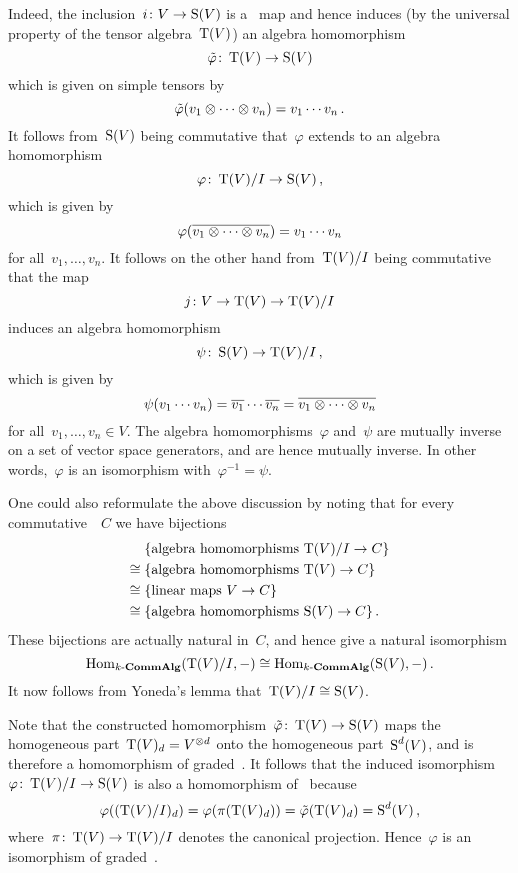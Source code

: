 Indeed, the inclusion~$i \colon V \to \operatorname{S}(V)$ is a~{\klin} map and hence induces (by the universal property of the tensor algebra~$\operatorname{T}(V)$) an algebra homomorphism
\[
          \tilde{\varphi}
  \colon  \operatorname{T}(V)
  \to     \operatorname{S}(V)
\]
which is given on simple tensors by
\[
    \tilde{\varphi}(v_1 \otimes \dotsb \otimes v_n)
  = v_1 \dotsm v_n \,.
\]
It follows from~$\operatorname{S}(V)$ being commutative that~$\varphi$ extends to an algebra homomorphism
\[
          \varphi
  \colon  \operatorname{T}(V)/I
  \to     \operatorname{S}(V) \,,
\]
which is given by
\[
    \varphi( \overline{v_1 \otimes \dotsb \otimes v_n} )
  = v_1 \dotsm v_n
\]
for all~$v_1, \dotsc, v_n$.
It follows on the other hand from~$\operatorname{T}(V)/I$ being commutative that the {\klin} map
\[
          j
  \colon  V
  \to     \operatorname{T}(V)
  \to     \operatorname{T}(V)/I
\]
induces an algebra homomorphism
\[
          \psi
  \colon  \operatorname{S}(V)
  \to     \operatorname{T}(V)/I \,,
\]
which is given by
\[
    \psi(v_1 \dotsm v_n)
  = \overline{v_1} \dotsm \overline{v_n}
  = \overline{v_1 \otimes \dotsb \otimes v_n}
\]
for all~$v_1, \dotsc, v_n \in V$.
The algebra homomorphisms~$\varphi$ and~$\psi$ are mutually inverse on a set of vector space generators, and are hence mutually inverse.
In other words,~$\varphi$ is an isomorphism with~$\varphi^{-1} = \psi$.


\begin{remark}
  One could also reformulate the above discussion by noting that for every commutative~{\kalg}~$C$ we have bijections
  \begin{align*}
         {}&  \{ \text{algebra homomorphisms~$\operatorname{T}(V)/I \to C$} \} \\
    \cong{}&  \{ \text{algebra homomorphisms~$\operatorname{T}(V) \to C$} \} \\
    \cong{}&  \{ \text{linear maps~$V \to C$} \}  \\
    \cong{}&  \{ \text{algebra homomorphisms~$\operatorname{S}(V) \to C$} \} \,.
  \end{align*}
  These bijections are actually natural in~$C$, and hence give a natural isomorphism
  \[
          \operatorname{Hom}_{\text{$k$-$\mathbf{CommAlg}$}}(\operatorname{T}(V)/I, -)
    \cong \operatorname{Hom}_{\text{$k$-$\mathbf{CommAlg}$}}(\operatorname{S}(V), -) \,.
  \]
  It now follows from Yoneda’s lemma that~$\operatorname{T}(V)/I \cong \operatorname{S}(V)$.
\end{remark}

Note that the constructed homomorphism~$\tilde{\varphi} \colon \operatorname{T}(V) \to \operatorname{S}(V)$ maps the homogeneous part~$\operatorname{T}(V)_d = V^{\otimes d}$ onto the homogeneous part~$\operatorname{S}^d(V)$, and is therefore a homomorphism of graded~{\kalgs}.
It follows that the induced isomorphism~$\varphi \colon \operatorname{T}(V)/I \to \operatorname{S}(V)$ is also a homomorphism of~{\kalgs} because
\[
    \varphi( (\operatorname{T}(V)/I)_d )
  = \varphi( \pi(\operatorname{T}(V)_d) )
  = \tilde{\varphi}( \operatorname{T}(V)_d )
  = \operatorname{S}^d(V) \,,
\]
where~$\pi \colon \operatorname{T}(V) \to \operatorname{T}(V)/I$ denotes the canonical projection.
Hence~$\varphi$ is an isomorphism of graded~{\kalgs}.

